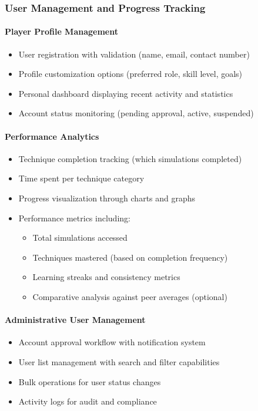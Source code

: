 \documentclass[12pt,a4paper]{article}
\begin{document}
\begin{enumerate}
\subsubsection{User Management and Progress Tracking}
\paragraph{Player Profile Management}
\begin{itemize}
    \item User registration with validation (name, email, contact number)
    \item Profile customization options (preferred role, skill level, goals)
    \item Personal dashboard displaying recent activity and statistics
    \item Account status monitoring (pending approval, active, suspended)
\end{itemize}

\paragraph{Performance Analytics}
\begin{itemize}
    \item Technique completion tracking (which simulations completed)
    \item Time spent per technique category
    \item Progress visualization through charts and graphs
    \item Performance metrics including:
    \begin{itemize}
        \item Total simulations accessed
        \item Techniques mastered (based on completion frequency)
        \item Learning streaks and consistency metrics
        \item Comparative analysis against peer averages (optional)
    \end{itemize}
\end{itemize}

\paragraph{Administrative User Management}
\begin{itemize}
    \item Account approval workflow with notification system
    \item User list management with search and filter capabilities
    \item Bulk operations for user status changes
    \item Activity logs for audit and compliance
\end{itemize}


\end{enumerate}
\end{document}

